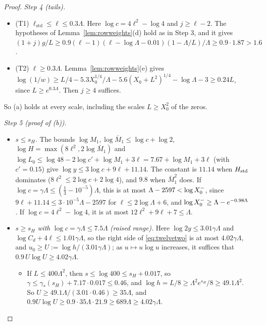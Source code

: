 \begin{proof}
\emph{Step 4 (tails).}
\begin{itemize}
\item (T1) $\ell_{\mathrm{std}}\le\ell\le0.3\Lambda$. Here $\log c=4\ell^2-\log4$ and $j\ge\ell-2$. The hypotheses of Lemma~\ref{lem:rowweights}(d) hold as in Step 3, and it
  gives $(1+j)g/L\ge0.9(\ell-1)(\ell-\log\Lambda-0.01)(1-\Lambda/L)/\Lambda\ge0.9\cdot1.87>1.6$.
\item (T2) $\ell\ge0.3\Lambda$. Lemma~\ref{lem:rowweights}(e) gives
  $\log(1/w)\ge L/4-5.3X_0^{1/4}/\Lambda-5.6(X_0+L^2)^{1/4}-\log\Lambda-3\ge0.24L$, since $L\ge e^{0.3\Lambda}$. Then $j\ge4$
  suffices.
\end{itemize}
So (a) holds at every scale, including the scales $L\ge X_0^2$ of the zeros.

\emph{Step 5 (proof of (b)).}
\begin{itemize}
\item \emph{$s\le s_H$.} The bounds $\log M_1,\log\bar M_1\le\log c+\log2$, $\log H=\max(8\ell^2,2\log\bar M_1)$ and
  $\log L_0\le\log48-2\log c'+\log M_1+3\ell=7.67+\log M_1+3\ell$ (with $c'=0.15$) give $\log y\le3\log c+9\ell+11.14$. The
  constant is $11.14$ when $H_{\mathrm{std}}$ dominates ($8\ell^2\le2\log c+2\log4$), and $9.8$ when $\bar M_1^2$ does. If
  $\log c=\gamma\Lambda\le(\tfrac13-10^{-5})\Lambda$, this is at most $\Lambda-2597<\log X_0^{-}$, since
  $9\ell+11.14\le3\cdot10^{-5}\Lambda-2597$ for $\ell\le2\log\Lambda+6$, and $\log X_0^{-}\ge\Lambda-e^{-0.98\Lambda}$. If
  $\log c=4\ell^2-\log4$, it is at most $12\ell^2+9\ell+7\le\Lambda$.
\item \emph{$s\ge s_H$ with $\log c=\gamma\Lambda\le7.5\Lambda$ (raised range).} Here $\log2y\le3.01\gamma\Lambda$ and
  $\log C_d+4\ell\le1.01\gamma\Lambda$, so the right side of \eqref{eq:twelvetwo} is at most $4.02\gamma\Lambda$, and
  $u_0\ge U:=\log h/(3.01\gamma\Lambda)$; as $u\mapsto u\log u$ increases, it suffices that $0.9\,U\log U\ge4.02\gamma\Lambda$.
  \begin{itemize}
  \item If $L\le400\Lambda^2$, then $s\le\log400\le s_H+0.017$, so $\gamma\le\gamma_*(s_H)+7.17\cdot0.017\le0.46$, and
    $\log h=L/8\ge\Lambda^2e^{s_H}/8\ge49.1\Lambda^2$. So $U\ge49.1\Lambda/(3.01\cdot0.46)\ge35\Lambda$, and
    $0.9U\log U\ge0.9\cdot35\Lambda\cdot21.9\ge689\Lambda\ge4.02\gamma\Lambda$.

\end{itemize}
\end{itemize}
\end{proof}
